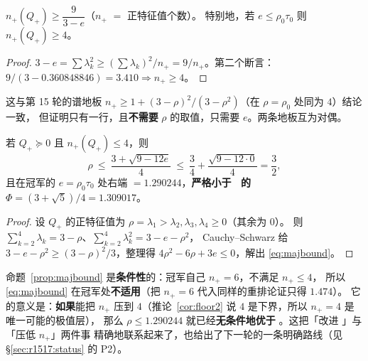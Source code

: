 \begin{corollary}[一行式谱地板]\label{cor:floor2}
$n_+(Q_+)\ge\dfrac{9}{3-e}$（$n_+$ $=$ 正特征值个数）。
特别地，若 $e\le\rho_0\tau_0$ 则 $n_+(Q_+)\ge4$。
\end{corollary}

\begin{proof}
$3-e=\sum\lambda_k^2\ge(\sum\lambda_k)^2/n_+=9/n_+$。第二个断言：$9/(3-0.360848846)=3.410\Rightarrow n_+\ge4$。
\end{proof}

\begin{remark}
这与第 15 轮的谱地板 $n_+\ge1+(3-\rho)^2/(3-\rho^2)$（在 $\rho=\rho_0$ 处同为 $4$）结论一致，
但证明只有一行，且\textbf{不需要} $\rho$ 的取值，只需要 $e$。两条地板互为对偶。
\end{remark}

\begin{proposition}\label{prop:majbound}
若 $Q_+\succeq0$ 且 $n_+(Q_+)\le4$，则
\begin{equation}\label{eq:majbound}
\rho\ \le\ \frac{3+\sqrt{9-12e}}{4}\ \le\ \frac34+\frac{\sqrt{9-12\cdot0}}4=\frac32 ,
\end{equation}
且在冠军的 $e=\rho_0\tau_0$ 处右端 $=1.290244$，\textbf{严格小于 \STW\ 的 $\Phi=(3+\sqrt5)/4=1.309017$}。
\end{proposition}

\begin{proof}
设 $Q_+$ 的正特征值为 $\rho=\lambda_1>\lambda_2,\lambda_3,\lambda_4\ge0$（其余为 $0$）。
则 $\sum_{k=2}^4\lambda_k=3-\rho$、$\sum_{k=2}^4\lambda_k^2=3-e-\rho^2$，
Cauchy--Schwarz 给 $3-e-\rho^2\ge(3-\rho)^2/3$，整理得 $4\rho^2-6\rho+3e\le0$，解出 \eqref{eq:majbound}。
\end{proof}

\begin{remark}[诚实标注]\label{rmk:majcond}
命题~\ref{prop:majbound} 是\textbf{条件性}的：冠军自己 $n_+=6$，不满足 $n_+\le4$，
所以 \eqref{eq:majbound} 在冠军处\textbf{不适用}（把 $n_+=6$ 代入同样的重排论证只得 $1.474$）。
它的意义是：\textbf{如果}能把 $n_+$ 压到 $4$（推论~\ref{cor:floor2} 说 $4$ 是下界，所以 $n_+=4$ 是唯一可能的极值层），
那么 $\rho\le1.290244$ 就已经\textbf{无条件地优于} \STW。这把「改进 \STW」与「压低 $n_+$」两件事
精确地联系起来了，也给出了下一轮的一条明确路线（见 \S\ref{sec:r1517:status} 的 P2）。
\end{remark}


